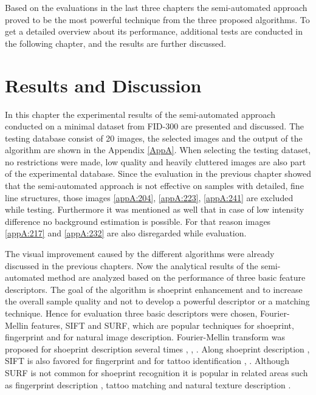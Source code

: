 \documentclass[draft,final]{vutinfth} %
\begin{document}
\par
Based on the evaluations in the last three chapters the semi-automated approach proved to be the most powerful technique from the three proposed algorithms.
To get a detailed overview about its performance, additional tests are conducted in the following chapter, and the results are further discussed.

\chapter{Results and Discussion}
\par
In this chapter the experimental results of the semi-automated approach conducted on a minimal dataset from FID-300 are presented and discussed.
The testing database consist of 20 images, the selected images and the output of the algorithm are shown in the Appendix \ref{AppA}.
When selecting the testing dataset, no restrictions were made, low quality and heavily cluttered images are also part of the experimental database.
Since the evaluation in the previous chapter showed that the semi-automated approach is not effective on samples with detailed, fine line structures, those images \ref{appA:204}, \ref{appA:223}, \ref{appA:241} are excluded while testing.
Furthermore it was mentioned as well that in case of low intensity difference no background estimation is possible. For that reason images \ref{appA:217} and \ref{appA:232} are also disregarded while evaluation.
\par
The visual improvement caused by the different algorithms were already discussed in the previous chapters.
Now the analytical results of the semi-automated method are analyzed based on the performance of three basic feature descriptors.
The goal of the algorithm is shoeprint enhancement and to increase the overall sample quality and not to develop a powerful descriptor or a matching technique.
Hence for evaluation three basic descriptors were chosen, Fourier-Mellin features, SIFT and SURF, which are popular techniques for shoeprint, fingerprint and for natural image description.
Fourier-Mellin transform was proposed for shoeprint description several times \cite{gueham2008automatic}, \cite{richetelli2017classification}, \cite{wu2019crime}.
Along shoeprint description \cite{nibouche2009rotation}, \cite{richetelli2017classification} SIFT is also favored for fingerprint \cite{zhou2011adaptive} and for tattoo identification \cite{yi2015impact}, \cite{han2013tattoo}.
Although SURF is not common for shoeprint recognition it is popular in related areas such as fingerprint description \cite{jahan2017robust}, tattoo matching \cite{yi2015impact} and natural texture description \cite{prabhakar2012lbp}.
\end{document}
